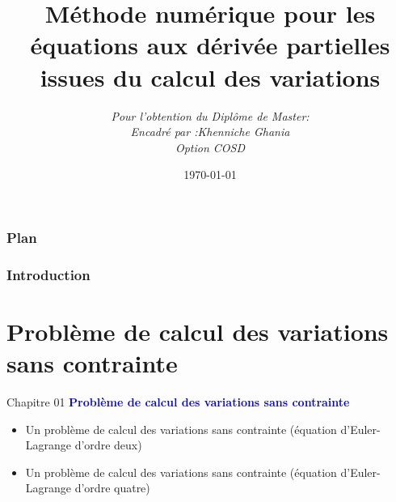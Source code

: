 \documentclass[12pt]{beamer}
\title[]{\bf  M\'{e}thode num\'{e}rique pour les \'{e}quations aux d\'{e}riv\'{e}e partielles issues du calcul des variations}
\author[COSD MATHS,FACT SCIENCES, UNIV SKIKDA]{  \it Pour l'obtention du Dipl\^ome de Master: \\ \it Encadr\'e par :Khenniche Ghania \\  Option COSD  } %
\date{\today}
\begin{document}
	\begin{frame}
	\titlepage
\end{frame}


\begin{frame}
\frametitle{Plan}
\tableofcontents
\end{frame}
\begin{frame}
\frametitle{Introduction}
	
	\end{frame}

\section{Probl\`{e}me de calcul des variations sans contrainte}
\begin{frame}{Chapitre 01}
	\textbf{\textcolor{blue}{\large {Probl\`{e}me de calcul des variations sans contrainte}}}
\begin{itemize}
	\item Un probl\`{e}me de calcul des variations sans contrainte (\'{e}quation d'Euler-Lagrange d'ordre deux)
	\item Un probl\`{e}me de calcul des variations sans contrainte (\'{e}quation d'Euler-Lagrange d'ordre quatre)
\end{itemize}
\end{frame}
\end{document}

